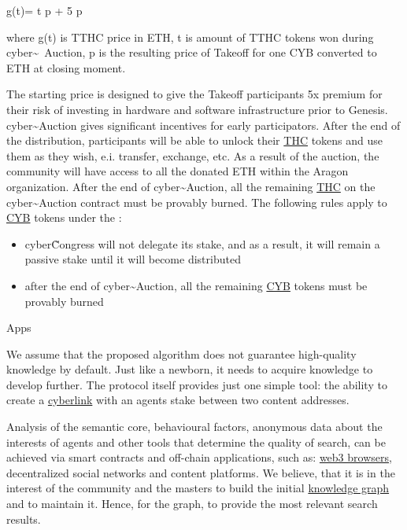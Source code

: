 \documentclass[8pt,oneside]{amsart}
\makeatletter
\newcommand{\linkgreen}[2]{\href{#1}{\color{green}{#2}}}
\renewcommand\subsection{\@startsection{subsection}
                                    {2}{\z@}
                                    {-3.25ex\@plus -1ex \@minus -.2ex}
                                    {0ex \@plus .2ex}
                                    {\play\Large}
                        }
\newcommand{\titleSection}[1]{\subsection{#1}}
\makeatother
\begin{document}
$$g(t)= \cdot t \cdot p + 5 \cdot p

where g(t) is TTHC price in ETH, t is amount of TTHC tokens won during cyber\~{}~Auction, p is the resulting price of Takeoff for one CYB converted to ETH at closing moment.

The starting price is designed to give the Takeoff participants 5x premium for their risk of investing in hardware and software infrastructure prior to Genesis. cyber\~{}Auction gives significant incentives for early participators. After the end of the distribution, participants will be able to unlock their {\hyperref[thc]{THC}} tokens and use them as they wish, e.i. transfer, exchange, etc. As a result of the auction, the community will have access to all the donated ETH within the Aragon organization. After the end of cyber\~{}Auction, all the remaining {\hyperref[thc]{THC}} on the cyber\~{}Auction contract must be provably burned. The following rules apply to {\hyperref[cyb]{CYB}} tokens under the \linkgreen{https://cyber.page/network/cyber/contract/cyber147drnke9676972jr3anklkj7pzgwjw47cp2u7j}{multisig for distribution}:

\begin{itemize}
\item cyber\~Congress will not delegate its stake, and as a result, it will remain a passive stake until it will become distributed
\item after the end of cyber\~{}Auction, all the remaining {\hyperref[cyb]{CYB}} tokens must be provably burned
\end{itemize}

\titleSection{Apps}\label{apps}

We assume that the proposed algorithm does not guarantee high-quality knowledge by default. Just like a newborn, it needs to acquire knowledge to develop further. The protocol itself provides just one simple tool: the ability to create a {\hyperref[cyberlinks]{cyberlink}} with an agents stake between two content addresses.

Analysis of the semantic core, behavioural factors, anonymous data about the interests of agents and other tools that determine the quality of search, can be achieved via smart contracts and off-chain applications, such as: {\hyperref[browzers]{web3 browsers}}, decentralized social networks and content platforms. We believe, that it is in the interest of the community and the masters to build the initial {\hyperref[knowledge-graph]{knowledge graph}} and to maintain it. Hence, for the graph, to provide the most relevant search results.
\end{document}
